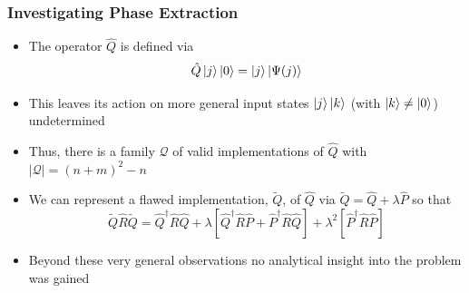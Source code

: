 \documentclass{beamer}
\begin{document}
\begin{frame}
\frametitle{Investigating Phase Extraction}
\begin{itemize}
\item The operator $\hat{Q}$ is defined via 
\begin{equation}
\hat{Q} \ket{j} \ket{0} = \ket{j} \ket{\Psi(j)}
\end{equation}
\item This leaves its action on more general input states $\ket{j}\ket{k}$ (with $\ket{k} \neq \ket{0}$) \alert{undetermined} 
\item Thus, there is a \alert{family} $\mathcal{Q}$ of valid implementations of $\hat{Q}$ with $|\mathcal{Q}|=(n+m)^2 -n$ 
\item We can represent a flawed implementation, $\tilde{Q}$, of $\hat{Q}$ via $\tilde{Q} = \hat{Q} + \lambda \hat{P}$ so that 
\begin{equation}
\tilde{Q}\hat{R} \tilde{Q} = \hat{Q}^\dagger \hat{R} \hat{Q} + \lambda \left[ \hat{Q}^\dagger  \hat{R} \hat{P} + \hat{P}^\dagger \hat{R} \hat{Q}\right] + \lambda^2 \left[ \hat{P}^\dagger \hat{R} \hat{P} \right]
\end{equation}
\item Beyond these very general observations \alert{no analytical insight into the problem was gained}
\end{itemize}
\end{frame}
\end{document}
